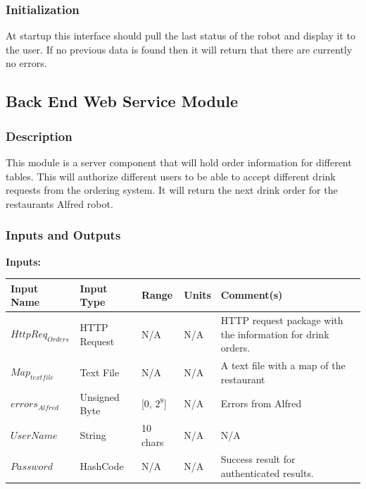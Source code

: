 \documentclass [10pt]{article}
\begin{document}

\subsubsection{Initialization}
At startup this interface should pull the last status of the robot and display it to the user. If no previous data is found then it will return that there are currently no errors.


\subsection{Back End Web Service Module}


\subsubsection{Description}
This module is a server component that will hold order information for different tables. This will  authorize different users to be able to accept different drink requests from the ordering system. It will return the next drink order for the restaurants Alfred robot.


\subsubsection{Inputs and Outputs}

\textbf{Inputs: } \\

\begin{longtable}{| p{} | p{} | p{} | p{} | p{} |}\hline 
	\rowcolor{tableCell}\textbf{Input Name} & \textbf{Input Type} & \textbf{Range} & \textbf{Units} & \textbf{Comment(s)} \\ \hline
	$ HttpReq_{Orders} $ & HTTP Request & N/A & N/A & HTTP request package with the information for drink orders. \\ \hline
	\rowcolor{tableCell}$ Map_{textfile} $ & Text File & N/A & N/A & A text file with a map of the restaurant \\ \hline
	$  errors_{Alfred} $ & Unsigned Byte & [0, $2^{8}$]& N/A & Errors from Alfred \\ \hline
	\rowcolor{tableCell}$  UserName $ & String & 10 chars & N/A & N/A\\ \hline
	$  Password $ & HashCode & N/A & N/A &  Success result for authenticated results. \\ \hline
\end{longtable}
\end{document}
